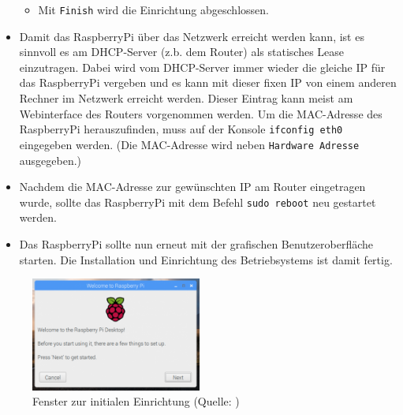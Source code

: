 \begin{itemize}
{\begin{itemize}
		\item {Mit \lstinline|Finish| wird die Einrichtung abgeschlossen.}
		\end{itemize}
		}
	\item {Damit das RaspberryPi über das Netzwerk erreicht werden kann, ist es sinnvoll es am DHCP-Server (z.b. dem Router) als statisches Lease \cite{lease} einzutragen.
		Dabei wird vom DHCP-Server immer wieder die gleiche IP für das RaspberryPi vergeben und es kann mit dieser fixen IP von einem anderen Rechner im Netzwerk erreicht werden.
		Dieser Eintrag kann meist am Webinterface des Routers vorgenommen werden.
		Um die MAC-Adresse des RaspberryPi herauszufinden, muss auf der Konsole \lstinline|ifconfig eth0| eingegeben werden.
		(Die MAC-Adresse wird neben \lstinline|Hardware Adresse| ausgegeben.)
		}
	\item {Nachdem die MAC-Adresse zur gewünschten IP am Router eingetragen wurde, sollte das RaspberryPi mit dem Befehl \lstinline|sudo reboot| neu gestartet werden.
		}
	\item {Das RaspberryPi sollte nun erneut mit der grafischen Benutzeroberfläche starten.
		Die Installation und Einrichtung des Betriebsystems ist damit fertig.
		}
\end{itemize}

\begin{figure}[h!]
	\centering
		\includegraphics[width=0.5\textwidth]{./fotos/wiz1-500x334.png}
	\caption{Fenster zur initialen Einrichtung (Quelle: \cite{wiz1})}
	\label{fig:rpiwiz1}
\end{figure}


